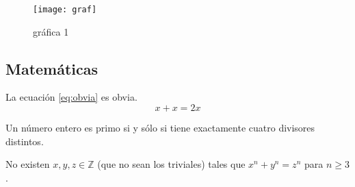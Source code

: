 \begin{figure}[htp]
	\centering
		\texttt{[image: graf]}
	\caption{gráfica 1}
	\label{fig:uanl}
\end{figure}

\subsection{Matemáticas}



La ecuación \eqref{eq:obvia} es obvia.
\begin{equation}
	x + x = 2x
	\label{eq:obvia}
\end{equation}



\begin{definicion}
	Un número entero es primo si y sólo si tiene exactamente cuatro divisores distintos.
\end{definicion}



\begin{teorema}[Fermat]
	No existen $x,y,z \in \mathbb{Z}$ (que no sean los triviales) tales que $x^n + y^n = z^n$ para $n \geq 3$.
\end{teorema}
